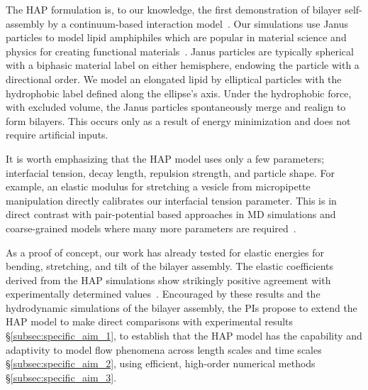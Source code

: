 The HAP formulation is, to our knowledge, the first demonstration of
bilayer self-assembly by a continuum-based interaction
model~\cite{Noguchi2001, Farago2003, Brannigan2006, Brooks2009,
Wang2013}. Our simulations use Janus particles to model lipid
amphiphiles which are popular in material science and physics for
creating functional materials~\cite{Lee2014, Lee2013}. Janus particles
are typically spherical with a biphasic material label on either
hemisphere, endowing the particle with a directional order. We model an
elongated lipid by elliptical particles with the hydrophobic label
defined along the ellipse's axis. Under the hydrophobic force, with
excluded volume, the Janus particles spontaneously merge and realign
to form bilayers. This occurs only as a result of energy minimization
and does not require artificial inputs.

It is worth emphasizing that the HAP model uses only a few parameters;
interfacial tension, decay length, repulsion strength, and particle
shape. For example, an elastic modulus for stretching a vesicle from
micropipette manipulation directly calibrates our interfacial tension
parameter. This is in direct contrast with pair-potential based
approaches in MD simulations and coarse-grained models where many more
parameters are required~\cite{Varilly2011, Wang2013}.

As a proof of concept, our work has already tested for elastic energies
for bending, stretching, and tilt of the bilayer assembly. The elastic
coefficients derived from the HAP simulations show strikingly positive
agreement with experimentally determined values~\cite{Fu2018_SIAM}.
Encouraged by these results and the hydrodynamic simulations of the
bilayer assembly, the PIs propose to extend the HAP model to make direct
comparisons with experimental results \S\ref{subsec:specific_aim_1}, to
establish that the HAP model has the capability and adaptivity to model
flow phenomena across length scales and time scales
\S\ref{subsec:specific_aim_2}, using efficient, high-order numerical
methods \S\ref{subsec:specific_aim_3}.

